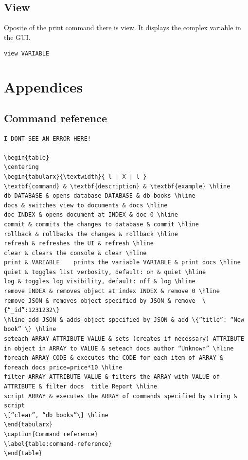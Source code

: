 \documentclass[10pt,a4paper,oneside]{report}
\begin{document}
\section{View}
Oposite of the print command there is view. It displays the complex variable in
the GUI.
\begin{verbatim}
view VARIABLE
\end{verbatim}


\chapter{Appendices}
\section{Command reference}
\begin{verbatim}
I DONT SEE AN ERROR HERE!

\begin{table}
\centering
\begin{tabularx}{\textwidth}{ l | X | l }
\textbf{command} & \textbf{description} & \textbf{example} \hline
db DATABASE	& opens database DATABASE & db books \hline
docs & switches view to documents & docs \hline
doc INDEX & opens document at INDEX & doc 0 \hline
commit & commits the changes to database & commit \hline
rollback & rollbacks the changes & rollback \hline
refresh & refreshes the UI & refresh \hline
clear & clears the console & clear \hline
print & VARIABLE	prints the variable VARIABLE & print docs \hline
quiet & toggles list verbosity, default: on & quiet \hline
log & toggles log visibility, default: off & log \hline
remove INDEX & removes object at index INDEX & remove 0 \hline
remove JSON & removes object specified by JSON & remove  \{“_id”:1231232\}
\hline add JSON & adds object specified by JSON & add \{”title”: “New book” \} \hline
seteach ARRAY ATTRIBUTE VALUE & sets (creates if necessary) ATTRIBUTE in object in ARRAY to VALUE & seteach docs author “Unknown” \hline
foreach ARRAY CODE & executes the CODE for each item of ARRAY & foreach docs price=price*10 \hline
filter ARRAY ATTRIBUTE VALUE & filters the ARRAY with VALUE of ATTRIBUTE & filter docs  title Report \hline
script ARRAY & executes the ARRAY of commands specified by string & script
\[“clear”, “db books”\] \hline
\end{tabularx}
\caption{Command reference}
\label{table:command-reference}
\end{table}
\end{verbatim}




%
\end{document}
